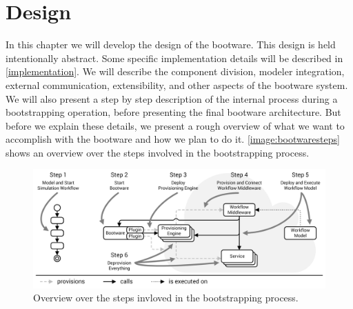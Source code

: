 \chapter{Design}
\label{design}

In this chapter we will develop the design of the bootware.
This design is held intentionally abstract.
Some specific implementation details will be described in \autoref{implementation}.
We will describe the component division, modeler integration, external communication, extensibility, and other aspects of the bootware system.
We will also present a step by step description of the internal process during a bootstrapping operation, before presenting the final bootware architecture.
But before we explain these details, we present a rough overview of what we want to accomplish with the bootware and how we plan to do it.
\autoref{image:bootwaresteps} shows an overview over the steps involved in the bootstrapping process.

\begin{figure}[!htbp]
	\centering
	\includegraphics[resolution=600]{design/assets/bootware_steps}
	\caption{Overview over the steps invloved in the bootstrapping process.}
	\label{image:bootwaresteps}
\end{figure}

